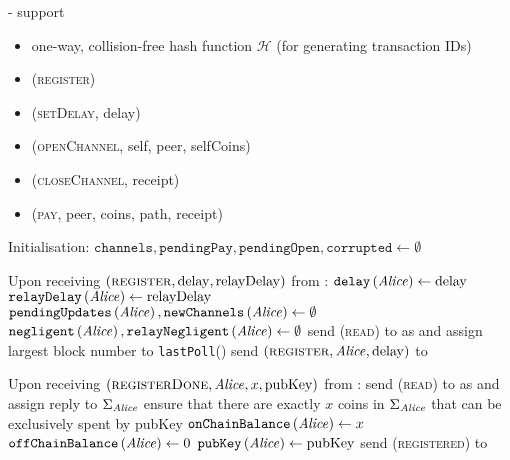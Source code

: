 \begin{systembox}{\fpaynet - support}
  \label{alg:fpaynet:support}
    \begin{itemize}
      \item one-way, collision-free hash function $\mathcal{H}$ (for generating
      transaction IDs)
    \end{itemize}

    \begin{itemize}
      \item (\textsc{register})
      \item (\textsc{setDelay}, delay)
      \item (\textsc{openChannel}, self, peer, selfCoins)
      \item (\textsc{closeChannel}, receipt)
      \item (\textsc{pay}, peer, coins, path, receipt)
    \end{itemize}

  \begin{algorithmic}[1]
    \State Initialisation:
    \Indent
      \State $\mathtt{channels}, \mathtt{pendingPay}, \mathtt{pendingOpen},
      \mathtt{corrupted} \gets \emptyset$
    \EndIndent
    \State

    \State Upon receiving $\left(\textsc{register}, \mathrm{delay},
    \mathrm{relayDelay}\right)$ from \alice:
    \Indent
      \State $\mathtt{delay}\left(\mathit{Alice}\right) \gets \mathrm{delay}$
      \State $\mathtt{relayDelay}\left(\mathit{Alice}\right) \gets \mathrm{relayDelay}$
      \State $\mathtt{pendingUpdates}\left(\mathit{Alice}\right),
      \mathtt{newChannels}\left(\mathit{Alice}\right) \gets \emptyset$
      \State $\mathtt{negligent}\left(\mathit{Alice}\right),
      \mathtt{relayNegligent}\left(\mathit{Alice}\right) \gets \emptyset$
      \State send (\textsc{read}) to \ledger{} as \alice{} and assign largest
      block number to \texttt{lastPoll}(\alice)
      \State send $\left(\textsc{register}, \mathit{Alice}, \mathrm{delay}\right)$ to
      \simulator
    \EndIndent
    \State

    \State Upon receiving $\left(\textsc{registerDone}, \mathit{Alice}, x,
    \mathrm{pubKey}\right)$ from \simulator:
    \Indent
      \State send (\textsc{read}) to \ledger{} as \alice{} and assign reply to
      $\Sigma_{\mathit{Alice}}$
      \State ensure that there are exactly $x$ coins in $\Sigma_{\mathit{Alice}}$ that
      can be exclusively spent by pubKey
      \State $\mathtt{onChainBalance}\left(\mathit{Alice}\right) \gets x$
      \State $\mathtt{offChainBalance}\left(\mathit{Alice}\right) \gets 0$
      \State $\mathtt{pubKey}\left(\mathit{Alice}\right) \gets \mathrm{pubKey}$
      \State send (\textsc{registered}) to \alice
    \EndIndent
    \State


\end{algorithmic}
\end{systembox}
